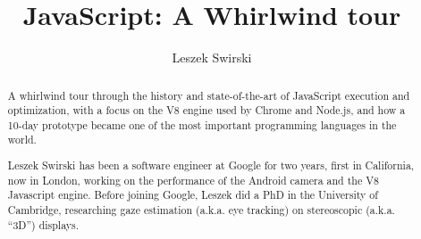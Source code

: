 \documentclass[a4paper,UKenglish]{oasics-v2016}
\title{JavaScript: A Whirlwind tour}
\author{Leszek Swirski}
\affil{Google Inc.}
\begin{document}
\maketitle
\begin{abstract}
A whirlwind tour through the history and state-of-the-art of JavaScript execution and optimization, with a focus on the V8 engine used by Chrome and Node.js, and how a 10-day prototype became one of the most important programming languages in the world.

Leszek Swirski has been a software engineer at Google for two years, first in California, now in London, working on the performance of the Android camera and the V8 Javascript engine.
Before joining Google, Leszek did a PhD in the University of Cambridge, researching gaze estimation (a.k.a. eye tracking) on stereoscopic (a.k.a. “3D”) displays.

\end{abstract}
\end{document}
